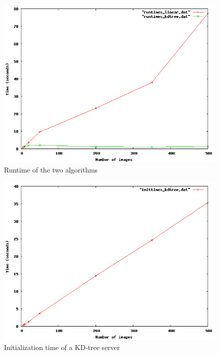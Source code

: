 \begin{figure}[ht!]
\centering
\includegraphics[width=.7\linewidth]{images/runtimesBasic.png}
\caption{Runtime of the two algorithms}
\label{fig:runtimesBasic}
\end{figure}

\begin{figure}[ht!]
\centering
\includegraphics[width=.7\linewidth]{images/inittimesBasic.png}
\caption{Initialization time of a KD-tree server}
\label{fig:inittimesBasic}
\end{figure}